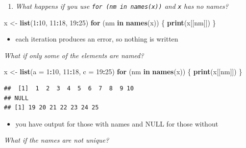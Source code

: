 \documentclass[]{book}
\newenvironment{Shaded}{\begin{snugshade}}{\end{snugshade}}
\newcommand{\ControlFlowTok}[1]{\textcolor[rgb]{0.13,0.29,0.53}{\textbf{#1}}}
\newcommand{\DataTypeTok}[1]{\textcolor[rgb]{0.13,0.29,0.53}{#1}}
\newcommand{\DecValTok}[1]{\textcolor[rgb]{0.00,0.00,0.81}{#1}}
\newcommand{\KeywordTok}[1]{\textcolor[rgb]{0.13,0.29,0.53}{\textbf{#1}}}
\newcommand{\NormalTok}[1]{#1}
\newcommand{\OperatorTok}[1]{\textcolor[rgb]{0.81,0.36,0.00}{\textbf{#1}}}
\newcommand{\StringTok}[1]{\textcolor[rgb]{0.31,0.60,0.02}{#1}}
\providecommand{\tightlist}{%
  \setlength{\itemsep}{0pt}\setlength{\parskip}{0pt}}
\theoremstyle{definition}
\theoremstyle{definition}
\theoremstyle{definition}
\theoremstyle{remark}
\begin{document}
\begin{enumerate}
\def\labelenumi{\arabic{enumi}.}
\setcounter{enumi}{1}
\tightlist
\item
  \emph{What happens if you use \texttt{for\ (nm\ in\ names(x))} and
  \texttt{x} has no names?}
\end{enumerate}

\begin{Shaded}
\begin{Highlighting}[]
\NormalTok{x <-}\StringTok{ }\KeywordTok{list}\NormalTok{(}\DecValTok{1}\OperatorTok{:}\DecValTok{10}\NormalTok{, }\DecValTok{11}\OperatorTok{:}\DecValTok{18}\NormalTok{, }\DecValTok{19}\OperatorTok{:}\DecValTok{25}\NormalTok{)}
\ControlFlowTok{for}\NormalTok{ (nm }\ControlFlowTok{in} \KeywordTok{names}\NormalTok{(x)) \{}
  \KeywordTok{print}\NormalTok{(x[[nm]])}
\NormalTok{\}}
\end{Highlighting}
\end{Shaded}

\begin{itemize}
\tightlist
\item
  each iteration produces an error, so nothing is written
\end{itemize}

\emph{What if only some of the elements are named? }

\begin{Shaded}
\begin{Highlighting}[]
\NormalTok{x <-}\StringTok{ }\KeywordTok{list}\NormalTok{(}\DataTypeTok{a =} \DecValTok{1}\OperatorTok{:}\DecValTok{10}\NormalTok{, }\DecValTok{11}\OperatorTok{:}\DecValTok{18}\NormalTok{, }\DataTypeTok{c =} \DecValTok{19}\OperatorTok{:}\DecValTok{25}\NormalTok{)}
\ControlFlowTok{for}\NormalTok{ (nm }\ControlFlowTok{in} \KeywordTok{names}\NormalTok{(x)) \{}
  \KeywordTok{print}\NormalTok{(x[[nm]])}
\NormalTok{\}}
\end{Highlighting}
\end{Shaded}

\begin{verbatim}
##  [1]  1  2  3  4  5  6  7  8  9 10
## NULL
## [1] 19 20 21 22 23 24 25
\end{verbatim}

\begin{itemize}
\tightlist
\item
  you have output for those with names and NULL for those without
\end{itemize}

\emph{What if the names are not unique?}
\end{document}
